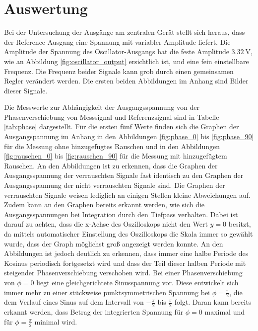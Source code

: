 \section{Auswertung}
\label{sec:Auswertung}

Bei der Untersuchung der Ausgänge am zentralen Gerät stellt sich heraus, dass
der Reference-Ausgang eine Spannung mit variabler Amplitude liefert. Die Amplitude
der Spannung des Oscillator-Ausgangs hat die feste Amplitude $\SI{3,32}{\volt}$,
wie an Abbildung \ref{fig:oscillator_output} ersichtlich ist, und eine fein einstellbare
Frequenz. Die Frequenz beider Signale kann grob durch einen gemeinsamen Regler verändert
werden. Die ersten beiden Abbildungen im Anhang sind Bilder dieser Signale.

Die Messwerte zur Abhängigkeit der Ausgangsspannung von der Phasenverschiebung
von Messsignal und Referenzsignal sind in Tabelle \ref{tab:phase} dargestellt.
Für die ersten fünf Werte finden sich die Graphen der Ausgangspannung im Anhang in
den Abbildungen \ref{fig:phase_0} bis \ref{fig:phase_90} für die Messung ohne hinzugefügtes
Rauschen und in den Abbildungen \ref{fig:rauschen_0} bis \ref{fig:rauschen_90} für
die Messung mit hinzugefügtem Rauschen.
An den Abbildungen ist zu erkennen, dass die Graphen der Ausgangsspannung
der verrauschten Signale fast identisch zu den Graphen der Ausgangsspannung
der nicht verrauschten Signale sind. Die Graphen der verrauschten Signale
weisen lediglich an einigen Stellen kleine Abweichungen auf.
Zudem kann an den Graphen bereits erkannt werden, wie sich die Ausgangsspannungen
bei Integration durch den Tiefpass verhalten. Dabei ist darauf zu achten, dass
die x-Achse des Oszilloskops nicht den Wert $y=0$ besitzt, da mittels automatischer
Einstellung des Oszilloskops die Skala immer so gewählt wurde, dass der Graph möglichst
groß angezeigt werden konnte. An den Abbildungen ist jedoch deutlich zu erkennen,
dass immer eine halbe Periode des Kosinus periodisch fortgesetzt wird und dass
der Teil dieser halben Periode mit steigender Phasenverschiebung verschoben wird.
Bei einer Phasenverschiebung von $\phi=0$ liegt eine gleichgerichtete Sinusspannung vor.
Diese entwickelt sich immer mehr zu einer stückweise punktsymmetrischen Spannung bei
$\phi=\frac{\pi}{2}$, die dem Verlauf eines Sinus auf dem Intervall von $-\frac{\pi}{2}$
bis $\frac{\pi}{2}$ folgt. Daran kann bereits erkannt werden, dass Betrag der integrierten
Spannung für $\phi=0$ maximal und für $\phi=\frac{\pi}{2}$ minimal wird.

